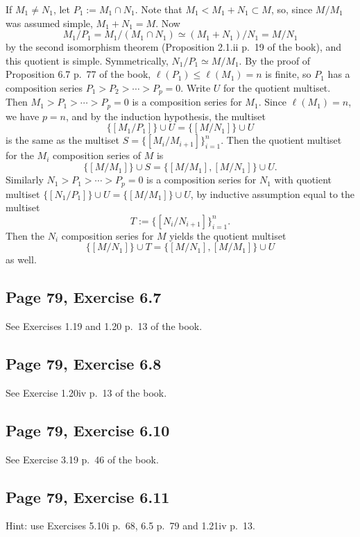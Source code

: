 \documentclass[parskip=half,fontsize=12pt]{scrartcl}%
\begin{document}
If $M_1\ne N_1$, let $P_1:=M_1\cap N_1$. Note that $M_1<M_1+N_1\subset M$, so, since $M/M_1$ was assumed simple, $M_1+N_1=M$. Now 
$$
M_1/P_1 = M_1/(M_1\cap N_1)\simeq(M_1+N_1)/N_1=M/N_1
$$ 
by the second isomorphism theorem (Proposition 2.1.ii p.~19 of the book), and this quotient is simple. Symmetrically, $N_1/P_1\simeq M/M_1$. By the proof of Proposition 6.7 p.~77 of the book, $\ell(P_1)\le\ell(M_1)=n$ is finite, so $P_1$ has a composition series $P_1>P_2>\cdots>P_p=0$. Write $U$ for the quotient multiset. Then $M_1>P_1>\cdots>P_p=0$ is a composition series for $M_1$. Since $\ell(M_1)=n$, we have $p=n$, and by the induction hypothesis, the multiset  
$$
\{[M_1/P_1]\}\cup U =\{[M/N_1]\}\cup U
$$ 
is the same as the multiset $S=\{[M_i/M_{i+1}]\}_{i=1}^n$. Then the quotient multiset for the $M_i$ composition series of $M$ is 
$$
\{[M/M_1]\}\cup S=\{[M/M_1],[M/N_1]\}\cup U.
$$ 
Similarly $N_1>P_1>\cdots>P_p=0$ is a composition series for $N_1$ with quotient multiset $\{[N_1/P_1]\}\cup U=\{[M/M_1]\}\cup U$, by inductive assumption equal to the multiset 
$$
T:=\{[N_i/N_{i+1}]\}_{i=1}^n.
$$ 
Then the $N_i$ composition series for $M$ yields the quotient multiset 
$$
\{[M/N_1]\}\cup T=\{[M/N_1],[M/M_1]\}\cup U
$$ 
as well.

\subsection{Page 79, Exercise 6.7}%

See Exercises 1.19 and 1.20 p.~13 of the book.

\subsection{Page 79, Exercise 6.8}%

See Exercise 1.20iv p.~13 of the book.

\subsection{Page 79, Exercise 6.10}%

See Exercise 3.19 p.~46 of the book.

\subsection{Page 79, Exercise 6.11}%

Hint: use Exercises 5.10i p.~68, 6.5 p.~79 and 1.21iv p.~13.
\end{document}
